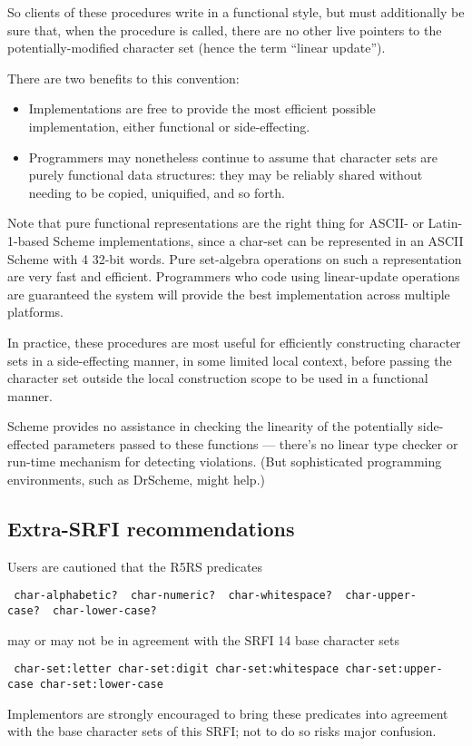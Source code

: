 So clients of these procedures write in a functional style, but must
additionally be sure that, when the procedure is called, there are no
other live pointers to the potentially-modified character set (hence the
term ``linear update'').

There are two benefits to this convention:

\begin{itemize}
\tightlist
\item
  Implementations are free to provide the most efficient possible
  implementation, either functional or side-effecting.
\item
  Programmers may nonetheless continue to assume that character sets are
  purely functional data structures: they may be reliably shared without
  needing to be copied, uniquified, and so forth.
\end{itemize}

Note that pure functional representations are the right thing for ASCII-
or Latin-1-based Scheme implementations, since a char-set can be
represented in an ASCII Scheme with 4 32-bit words. Pure set-algebra
operations on such a representation are very fast and efficient.
Programmers who code using linear-update operations are guaranteed the
system will provide the best implementation across multiple platforms.

In practice, these procedures are most useful for efficiently
constructing character sets in a side-effecting manner, in some limited
local context, before passing the character set outside the local
construction scope to be used in a functional manner.

Scheme provides no assistance in checking the linearity of the
potentially side-effected parameters passed to these functions ---
there's no linear type checker or run-time mechanism for detecting
violations. (But sophisticated programming environments, such as
DrScheme, might help.)

\subsection{{Extra-SRFI recommendations}}\label{extra-srfi-recommendations}

Users are cautioned that the R5RS predicates

\texttt{\ char-alphabetic?\ \ char-numeric?\ \ char-whitespace?\ \ char-upper-case?\ \ char-lower-case?\ }

may or may not be in agreement with the SRFI 14 base character sets

\texttt{\ char-set:letter\ char-set:digit\ char-set:whitespace\ char-set:upper-case\ char-set:lower-case}

Implementors are strongly encouraged to bring these predicates into
agreement with the base character sets of this SRFI; not to do so risks
major confusion.

